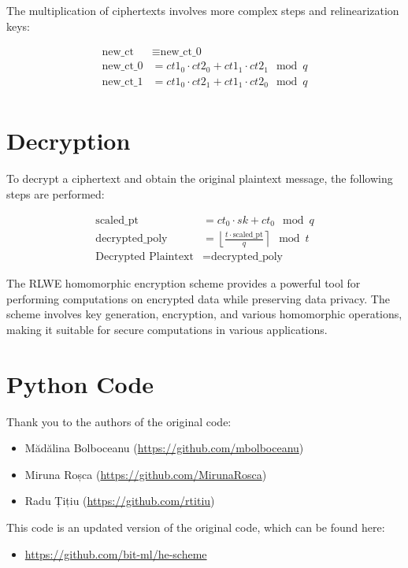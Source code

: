 \documentclass{article}
\begin{document}
The multiplication of ciphertexts involves more complex steps and relinearization keys:

\begin{align*}
    \text{new\_ct} &\equiv \text{new\_ct\_0} \\
    \text{new\_ct\_0} &= ct1_0 \cdot ct2_0 + ct1_1 \cdot ct2_1 \mod q \\
    \text{new\_ct\_1} &= ct1_0 \cdot ct2_1 + ct1_1 \cdot ct2_0 \mod q \\
\end{align*}

\section{Decryption}

To decrypt a ciphertext and obtain the original plaintext message, the following steps are performed:

\begin{align*}
    \text{scaled\_pt} &= ct_0 \cdot sk + ct_0 \mod q \\
    \text{decrypted\_poly} &= \left\lfloor \frac{t \cdot \text{scaled\_pt}}{q} \right\rceil \mod t \\
    \text{Decrypted Plaintext} &= \text{decrypted\_poly}
\end{align*}

The RLWE homomorphic encryption scheme provides a powerful tool for performing computations on encrypted data while preserving data privacy. The scheme involves key generation, encryption, and various homomorphic operations, making it suitable for secure computations in various applications.

\section{Python Code}

Thank you to the authors of the original code:
\begin{itemize}
    \item Mădălina Bolboceanu (\url{https://github.com/mbolboceanu})
    \item Miruna Roșca (\url{https://github.com/MirunaRosca})
    \item Radu Țițiu (\url{https://github.com/rtitiu})
\end{itemize}

This code is an updated version of the original code, which can be found here:
\begin{itemize}
    \item \url{https://github.com/bit-ml/he-scheme}
\end{itemize}
\end{document}
